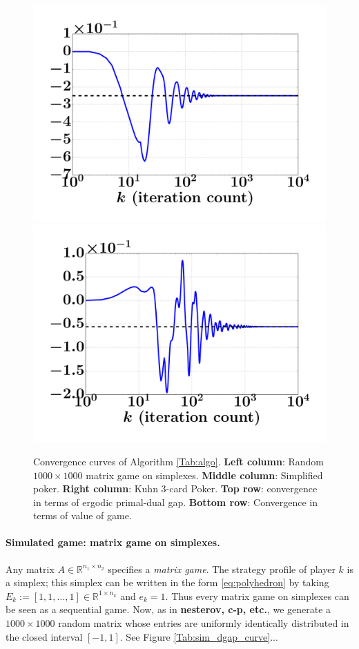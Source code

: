 \documentclass{article} %
\newtheorem{remark}{Remark}
\begin{document}
\begin{figure}[!htpb]
  \hspace{-.8em}
  \includegraphics[width=.34\linewidth]{SimplifiedPoker_NE.pdf}
  \hspace{-1.3em}
  \includegraphics[width=.34\linewidth]{Kuhn3112_NE.pdf}
  \caption{Convergence curves of Algorithm
    \ref{Tab:algo}. \textbf{Left column}: Random $1000
    \times 1000$ matrix game on simplexes. \textbf{Middle column}:
    Simplified poker. \textbf{Right column}: Kuhn 3-card
    Poker. \textbf{Top row}: convergence in terms of ergodic
    primal-dual gap. \textbf{Bottom row}: Convergence in terms of
    value of game.}
  \label{Tab:dgap_curve}
\end{figure}


\paragraph{Simulated game: matrix game on simplexes.}
Any matrix $A \in \mathbb{R}^{n_1 \times n_2}$ specifies a
\textit{matrix game}. The strategy profile of player $k$ is a simplex;
this simplex can be written in the form \eqref{eq:polyhedron} by
taking $E_k := [1, 1, ..., 1] \in \mathbb{R}^{1 \times n_k}$ and $e_k
= 1$. Thus every matrix game on simplexes can be seen as a sequential
game. Now, as in \textbf{nesterov, c-p, etc.}, we generate a $1000
\times 1000$ random matrix whose entries are uniformly identically
distributed in the closed interval $[-1, 1]$. See Figure \ref{Tab:sim_dgap_curve}...
\end{document}
